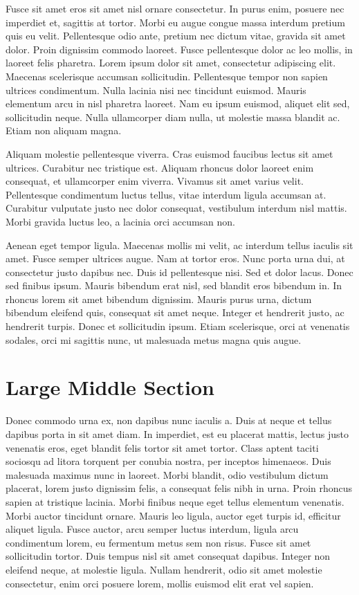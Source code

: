\documentclass[twocolumn,10pt]{article}
\begin{document}
Fusce sit amet eros sit amet nisl ornare consectetur. In purus enim, posuere nec imperdiet et, sagittis at tortor. Morbi eu augue congue massa interdum pretium quis eu velit. Pellentesque odio ante, pretium nec dictum vitae, gravida sit amet dolor. Proin dignissim commodo laoreet. Fusce pellentesque dolor ac leo mollis, in laoreet felis pharetra. Lorem ipsum dolor sit amet, consectetur adipiscing elit. Maecenas scelerisque accumsan sollicitudin. Pellentesque tempor non sapien ultrices condimentum. Nulla lacinia nisi nec tincidunt euismod. Mauris elementum arcu in nisl pharetra laoreet. Nam eu ipsum euismod, aliquet elit sed, sollicitudin neque. Nulla ullamcorper diam nulla, ut molestie massa blandit ac. Etiam non aliquam magna.

Aliquam molestie pellentesque viverra. Cras euismod faucibus lectus sit amet ultrices. Curabitur nec tristique est. Aliquam rhoncus dolor laoreet enim consequat, et ullamcorper enim viverra. Vivamus sit amet varius velit. Pellentesque condimentum luctus tellus, vitae interdum ligula accumsan at. Curabitur vulputate justo nec dolor consequat, vestibulum interdum nisl mattis. Morbi gravida luctus leo, a lacinia orci accumsan non.

Aenean eget tempor ligula. Maecenas mollis mi velit, ac interdum tellus iaculis sit amet. Fusce semper ultrices augue. Nam at tortor eros. Nunc porta urna dui, at consectetur justo dapibus nec. Duis id pellentesque nisi. Sed et dolor lacus. Donec sed finibus ipsum. Mauris bibendum erat nisl, sed blandit eros bibendum in. In rhoncus lorem sit amet bibendum dignissim. Mauris purus urna, dictum bibendum eleifend quis, consequat sit amet neque. Integer et hendrerit justo, ac hendrerit turpis. Donec et sollicitudin ipsum. Etiam scelerisque, orci at venenatis sodales, orci mi sagittis nunc, ut malesuada metus magna quis augue. 

\section*{Large Middle Section}
Donec commodo urna ex, non dapibus nunc iaculis a. Duis\cite{texbook} at neque et tellus dapibus porta in sit amet diam. In imperdiet, est eu placerat mattis, lectus justo venenatis eros, eget blandit felis tortor sit amet tortor. Class aptent taciti sociosqu ad litora torquent per conubia nostra, per inceptos himenaeos. Duis malesuada maximus nunc in laoreet. Morbi blandit, odio vestibulum dictum placerat, lorem justo dignissim felis, a consequat felis nibh in urna. Proin rhoncus sapien at tristique lacinia. Morbi finibus neque eget tellus elementum venenatis. Morbi auctor tincidunt ornare. Mauris leo ligula, auctor eget turpis id, efficitur aliquet ligula. Fusce auctor, arcu semper luctus interdum, ligula arcu condimentum lorem, eu fermentum metus sem non risus. Fusce sit amet sollicitudin tortor. Duis tempus nisl sit amet consequat dapibus. Integer non eleifend neque, at molestie ligula. Nullam hendrerit, odio sit amet molestie consectetur, enim orci posuere lorem, mollis euismod elit erat vel sapien.
\end{document}
